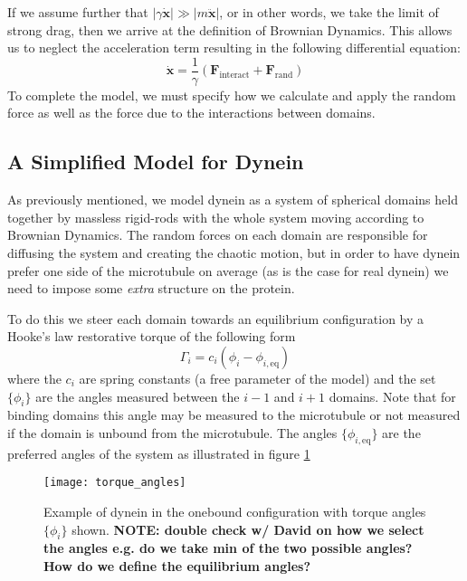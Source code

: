 	If we assume further that $|\gamma\dot{\mathbf{x}}|\gg |m\ddot{\mathbf{x}}|$, or in other words, we take the limit of strong drag, then we arrive at the definition of Brownian Dynamics. This allows us to neglect the acceleration term resulting in the following differential equation:
	\begin{equation}
		\dot{\mathbf{x}} = \frac{1}{\gamma}\left( \mathbf{F}_\text{interact} + \mathbf{F}_\text{rand} \right)
	\end{equation}
	To complete the model, we must specify how we calculate and apply the random force as well as the force due to the interactions between domains. 
	
	\subsection{A Simplified Model for Dynein}
	As previously mentioned, we model dynein as a system of spherical domains held together by massless rigid-rods with the whole system moving according to Brownian Dynamics. The random forces on each domain are responsible for diffusing the system and creating the chaotic motion, but in order to have dynein prefer one side of the microtubule on average (as is the case for real dynein) we need to impose some \textit{extra} structure on the protein. 
	
	To do this we steer each domain towards an equilibrium configuration by a Hooke's law restorative torque of the following form
	\begin{equation}
		\Gamma_i = c_i\left(\phi_i-\phi_{i,\text{eq}}\right)
	\end{equation}
	where the $c_i$ are spring constants (a free parameter of the model) and the set $\{\phi_i\}$ are the angles measured between the $i-1$ and $i+1$ domains. Note that for binding domains this angle may be measured to the microtubule or not measured if the domain is unbound from the microtubule. The angles $\{\phi_{i, \text{eq}}\}$ are the preferred angles of the system as illustrated in figure \ref{fig:torque angles}
	
	\begin{figure}[hbt!]
		\centering
		\texttt{[image: torque\_angles]}
		\caption{Example of dynein in the onebound configuration with torque angles $\{\phi_i\}$ shown. \textbf{NOTE: double check w/ David on how we select the angles e.g. do we take min of the two possible angles? How do we define the equilibrium angles?}}
		\label{fig:torque angles}
	\end{figure}
	
